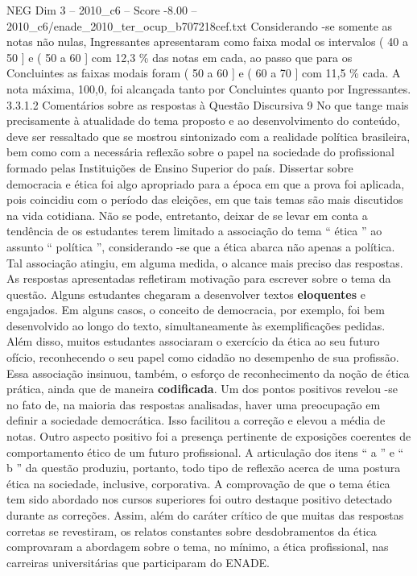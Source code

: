 \begin{textsample}{NEG Dim 3 – 2010\_c6 – Score -8.00 – 2010\_c6/enade\_2010\_ter\_ocup\_b707218cef.txt}
Considerando -se somente as notas não nulas, Ingressantes apresentaram como faixa modal os intervalos ( 40 a 50 ] e ( 50 a 60 ] com 12,3 \% das notas em cada, ao passo que para os Concluintes as faixas modais foram ( 50 a 60 ] e ( 60 a 70 ] com 11,5 \% cada.
A nota máxima, 100,0, foi alcançada tanto por Concluintes quanto por Ingressantes. 3.3.1.2 Comentários sobre as respostas à Questão Discursiva 9 No que tange mais precisamente à atualidade do tema proposto e ao desenvolvimento do conteúdo, deve ser ressaltado que se mostrou sintonizado com a realidade política brasileira, bem como com a necessária reflexão sobre o papel na sociedade do profissional formado pelas Instituições de Ensino Superior do país.
Dissertar sobre democracia e ética foi algo apropriado para a época em que a prova foi aplicada, pois coincidiu com o período das eleições, em que tais temas são mais discutidos na vida cotidiana.
Não se pode, entretanto, deixar de se levar em conta a tendência de os estudantes terem limitado a associação do tema “ ética ” ao assunto “ política ”, considerando -se que a ética abarca não apenas a política.
Tal associação atingiu, em alguma medida, o alcance mais preciso das respostas.
As respostas apresentadas refletiram motivação para escrever sobre o tema da questão.
Alguns estudantes chegaram a desenvolver textos \textbf{eloquentes} e engajados.
Em alguns casos, o conceito de democracia, por exemplo, foi bem desenvolvido ao longo do texto, simultaneamente às exemplificações pedidas.
Além disso, muitos estudantes associaram o exercício da ética ao seu futuro ofício, reconhecendo o seu papel como cidadão no desempenho de sua profissão.
Essa associação insinuou, também, o esforço de reconhecimento da noção de ética prática, ainda que de maneira \textbf{codificada}.
Um dos pontos positivos revelou -se no fato de, na maioria das respostas analisadas, haver uma preocupação em definir a sociedade democrática.
Isso facilitou a correção e elevou a média de notas.
Outro aspecto positivo foi a presença pertinente de exposições coerentes de comportamento ético de um futuro profissional.
A articulação dos itens “ a ” e “ b ” da questão produziu, portanto, todo tipo de reflexão acerca de uma postura ética na sociedade, inclusive, corporativa.
A comprovação de que o tema ética tem sido abordado nos cursos superiores foi outro destaque positivo detectado durante as correções.
Assim, além do caráter crítico de que muitas das respostas corretas se revestiram, os relatos constantes sobre desdobramentos da ética comprovaram a abordagem sobre o tema, no mínimo, a ética profissional, nas carreiras universitárias que participaram do ENADE.

\end{textsample}
